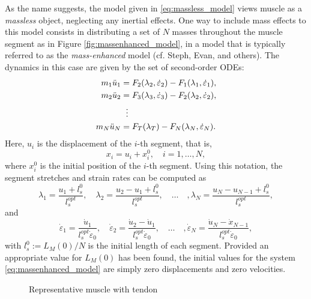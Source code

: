 \documentclass{sfuthesis}
\numberwithin{equation}{chapter}
\numberwithin{figure}{chapter}
\numberwithin{table}{chapter}
\theoremstyle{definition}
\newcommand{\depsilon}{\dot{\varepsilon}}
\begin{document}
As the name suggests, the model given in \eqref{eq:massless_model} views muscle as a \textit{massless} object, neglecting any inertial effects. One way to include mass effects to this model consists in distributing a set of $N$ masses throughout the muscle segment as in Figure \ref{fig:massenhanced_model}, in a model that is typically referred to as the \textit{mass-enhanced} model (cf. Steph, Evan, and others). The dynamics in this case are given by the set of second-order ODEs:
\begin{subequations}
    \begin{align}
        m_1 \ddot{u}_1 &= F_2(\lambda_2, \depsilon_2) - F_1(\lambda_1, \depsilon_1), \\
        m_2 \ddot{u}_2 &= F_3(\lambda_3, \depsilon_3) - F_2(\lambda_2, \depsilon_2), \\
        &\hspace{0.6em} \vdots \\
        m_N \ddot{u}_N &= F_T(\lambda_T) - F_N(\lambda_N, \depsilon_N).
    \end{align}
\end{subequations}
Here, $u_i$ is the displacement of the $i$-th segment, that is,
\begin{equation}
    x_i = u_i + x_i^0, \quad i=1,\dots,N,
\end{equation}
where $x_i^0$ is the initial position of the $i$-th segment. Using this notation, the segment stretches and strain rates can be computed as
\begin{equation}
    \lambda_1 = \dfrac{u_1 + l_s^0}{l_s^{opt}}, \quad \lambda_2 = \dfrac{u_2-u_1 + l_s^0}{l_s^{opt}}, \quad \dots \quad, \lambda_N = \dfrac{u_N-u_{N-1} + l_s^0}{l_s^{opt}},
\end{equation}
and
\begin{equation} \label{eq:massenhanced_model}
    \depsilon_1 = \dfrac{\dot{u}_1}{l_s^{opt} \depsilon_0}, \quad \depsilon_2 = \dfrac{\dot{u}_2-\dot{u}_1}{l_s^{opt} \depsilon_0}, \quad \dots \quad, \depsilon_N = \dfrac{\dot{u}_N - \dot{x}_{N-1}}{l_s^{opt} \depsilon_0},
\end{equation}
with $l_s^0 := L_M(0)/N$ is the initial length of each segment. Provided an appropriate value for $L_M(0)$ has been found, the initial values for the system \eqref{eq:massenhanced_model} are simply zero displacements and zero velocities.


\begin{figure}
    \caption{Representative muscle with tendon}
    \label{fig:typical_mtu}
\end{figure}
\end{document}
